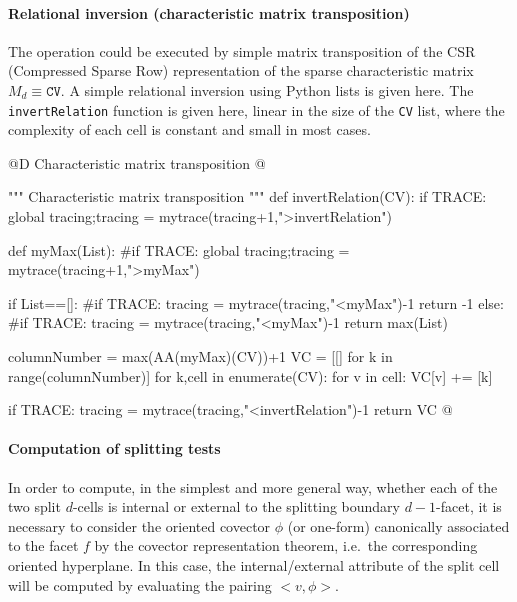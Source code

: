 \documentclass[11pt,oneside]{article}	%
\begin{document}
\paragraph{Relational inversion (characteristic matrix transposition)}

The operation could be executed by simple matrix transposition of the CSR (Compressed Sparse Row) representation of the sparse characteristic matrix $M_d \equiv \texttt{CV}$.
A simple relational inversion using Python lists is given here. The \texttt{invertRelation} function 
is given here, linear in the size of the \texttt{CV} list, where the complexity of each cell is constant and 
small in most cases.

@D Characteristic matrix transposition
@{""" Characteristic matrix transposition """
def invertRelation(CV):
	if TRACE: global tracing;tracing = mytrace(tracing+1,">invertRelation")

	def myMax(List):
		#if TRACE: global tracing;tracing = mytrace(tracing+1,">myMax")

		if List==[]: 
			#if TRACE: tracing = mytrace(tracing,"<myMax")-1
			return -1
		else: 
			#if TRACE: tracing = mytrace(tracing,"<myMax")-1
			return max(List)
			
	columnNumber = max(AA(myMax)(CV))+1
	VC = [[] for k in range(columnNumber)]
	for k,cell in enumerate(CV):
		for v in cell:
			VC[v] += [k]

	if TRACE: tracing = mytrace(tracing,"<invertRelation")-1
	return VC
@}


\paragraph{Computation of splitting tests}

In order to compute, in the simplest and more general way, whether each of the two split $d$-cells is internal or external to the splitting boundary $d-1$-facet, it is necessary to consider the oriented covector $\phi$ (or one-form) canonically associated to the facet $f$ by the covector representation theorem, i.e.~the corresponding oriented hyperplane. In this case, the internal/external attribute of the split cell will be computed by evaluating the pairing $<v,\phi>$.
\end{document}
